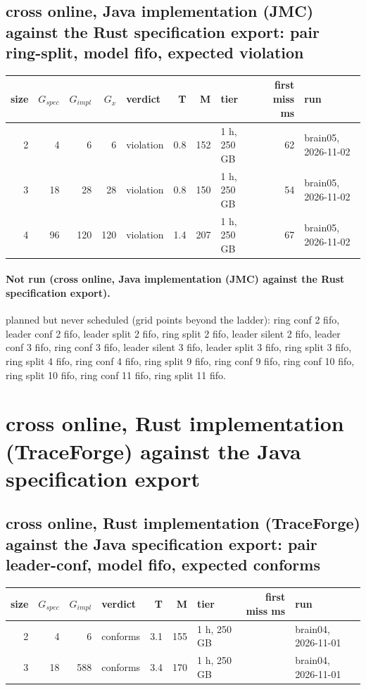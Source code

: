 \documentclass[10pt]{article}
\begin{document}
\subsection*{cross online, Java implementation (JMC) against the Rust specification export: pair \textsf{ring-split}, model fifo, expected violation}
\begin{longtable}{@{}rrrrlrrlrl@{}}
\toprule
size & $G_{\mathit{spec}}$ & $G_{\mathit{impl}}$ & $G_x$ & verdict & T & M & tier & first miss ms & run \\
\midrule
\endhead
\color{red} 2 & 4 & 6 & 6 & violation & 0.8 & 152 & 1 h, 250 GB & 62 & brain05, 2026-11-02 \\
\color{red} 3 & 18 & 28 & 28 & violation & 0.8 & 150 & 1 h, 250 GB & 54 & brain05, 2026-11-02 \\
\color{red} 4 & 96 & 120 & 120 & violation & 1.4 & 207 & 1 h, 250 GB & 67 & brain05, 2026-11-02 \\
\bottomrule
\end{longtable}
\paragraph{Not run (cross online, Java implementation (JMC) against the Rust specification export).}
planned but never scheduled (grid points beyond the ladder): ring conf 2 fifo, leader conf 2 fifo, leader split 2 fifo, ring split 2 fifo, leader silent 2 fifo, leader conf 3 fifo, ring conf 3 fifo, leader silent 3 fifo, leader split 3 fifo, ring split 3 fifo, ring split 4 fifo, ring conf 4 fifo, ring split 9 fifo, ring conf 9 fifo, ring conf 10 fifo, ring split 10 fifo, ring conf 11 fifo, ring split 11 fifo.\par
\section*{cross online, Rust implementation (TraceForge) against the Java specification export}
\subsection*{cross online, Rust implementation (TraceForge) against the Java specification export: pair \textsf{leader-conf}, model fifo, expected conforms}
\begin{longtable}{@{}rrrlrrlrl@{}}
\toprule
size & $G_{\mathit{spec}}$ & $G_{\mathit{impl}}$ & verdict & T & M & tier & first miss ms & run \\
\midrule
\endhead
\color{red} 2 & 4 & 6 & conforms & 3.1 & 155 & 1 h, 250 GB &  & brain04, 2026-11-01 \\
\color{red} 3 & 18 & 588 & conforms & 3.4 & 170 & 1 h, 250 GB &  & brain04, 2026-11-01 \\
\bottomrule
\end{longtable}
\end{document}

